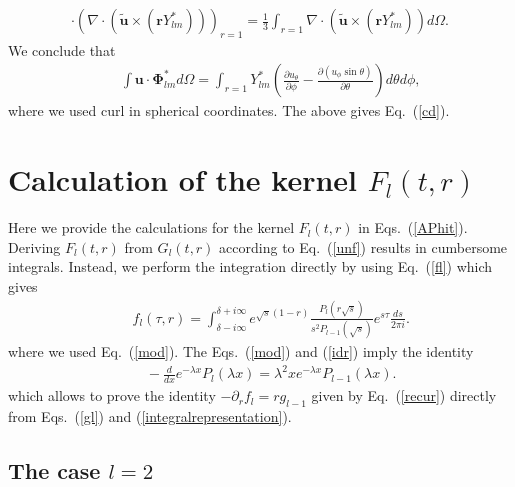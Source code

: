 \documentclass[aps,prx,twocolumn,amsmath,amssymb,amsfonts]{revtex4-2}
\begin{document}
{{\begin{appendices}
\begin{eqnarray}
\cdot\left(\nabla\cdot \left(\bm {\tilde u}\!\times\! (\bm r Y^*_{lm}) \right) \right)_{r=1}=\frac{1}{3}\int_{r=1}\nabla\cdot \left(\bm {\tilde u}\!\times\! (\bm r Y^*_{lm}) \right) d\Omega.\nonumber
\end{eqnarray}
We conclude that
\begin{eqnarray}&&\!\!\!\!\!\!\!
\int \!\!\bm u\!\cdot\! \bm \Phi_{lm}^* d\Omega\!=\!\int_{r=1} \!\! Y_{lm}^* \left(\frac{\partial u_{\theta}}{\partial\phi}\!-\!
\frac{\partial (u_{\phi}\sin\theta)}{\partial\theta}\right) d\theta d\phi,\label{projectphi}
\end{eqnarray}
where we used curl in spherical coordinates. The above gives Eq.~(\ref{cd}).

\section{Calculation of the kernel $F_l(t, r)$}
\label{ker}

Here we provide the calculations for the kernel $F_l(t, r)$ in Eqs.~(\ref{APhit}). Deriving $F_l(t, r)$ from $G_l(t, r)$ according to Eq.~(\ref{unf}) results in cumbersome integrals. Instead, we perform the integration directly by using Eq.~(\ref{fl}) which gives
\begin{eqnarray}&&\!\!\!\!\!\!\!
f_l(\tau, r)\!=\! \int_{\delta-i\infty}^{\delta+i\infty}e^{\sqrt{s}(1-r)}\frac{P_{l}(r \sqrt{s})}{s^{2} P_{l-1}(\sqrt{s})}e^{s\tau}\frac{ds}{2\pi i}. \label{integralrepresentation}
\end{eqnarray}
where we used Eq.~(\ref{mod}). The Eqs.~(\ref{mod}) and (\ref{idr}) imply the identity
\begin{eqnarray}&&\!\!\!\!\!\!\!\!
-\frac{d}{dx}e^{-\lambda x}P_l(\lambda x)=\lambda^2 x e^{-\lambda x}P_{l-1}(\lambda x).
\end{eqnarray}
which allows to prove the identity $-\partial_r f_l\!=\! rg_{l-1}$ given by Eq.~(\ref{recur}) directly from Eqs.~(\ref{gl}) and (\ref{integralrepresentation}).


\subsection{The case $l=2$}


\end{appendices}}}
\end{document}
